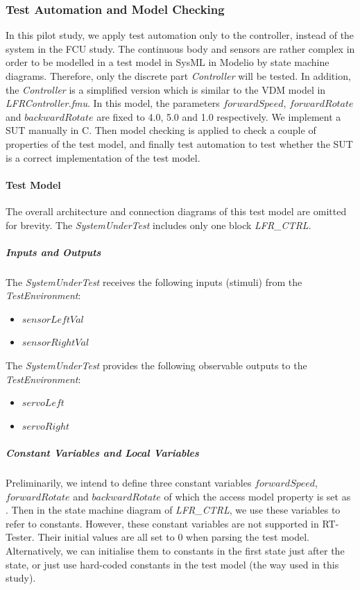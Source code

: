 \subsubsection{Test Automation and Model Checking}
\label{sec:lfr_ta}
\graphicspath{ {linefollower/TA/} }

In this pilot study, we apply test automation only to the controller, instead of the system in the FCU study. The continuous body and sensors are rather complex in order to be modelled in a test model in SysML in Modelio by state machine diagrams. Therefore, only the discrete part \emph{Controller} will be tested. In addition, the \emph{Controller} is a simplified version which is similar to the VDM model in \emph{LFRController.fmu}. In this model, the parameters $forwardSpeed$, $forwardRotate$ and $backwardRotate$ are fixed to 4.0, 5.0 and 1.0 respectively. We implement a SUT manually in C. Then model checking is applied to check a couple of properties of the test model, and finally test automation to test whether the SUT is a correct implementation of the test model.

\paragraph{Test Model}
The overall architecture and connection diagrams of this test model are omitted for brevity. The \emph{SystemUnderTest} includes only one block \emph{LFR\_CTRL}. 
\subparagraph{Inputs and Outputs}
The \emph{SystemUnderTest} receives the following inputs (stimuli) from the \emph{TestEnvironment}:
\begin{itemize}
    \item $sensorLeftVal$ %
    \item $sensorRightVal$ %
\end{itemize}

The \emph{SystemUnderTest} provides the following observable outputs to the \emph{TestEnvironment}:
\begin{itemize}
    \item $servoLeft$ %
    \item $servoRight$ %
\end{itemize}

\subparagraph{Constant Variables and Local Variables}
Preliminarily, we intend to define three constant variables $forwardSpeed$, $forwardRotate$ and $backwardRotate$ of which the access model property is set as . Then in the state machine diagram of \emph{LFR\_CTRL}, we use these variables to refer to constants. However, these constant variables are not supported in RT-Tester. Their initial values are all set to 0 when parsing the test model. Alternatively, we can initialise them to constants in the first state just after the  state, or just use hard-coded constants in the test model (the way used in this study).

